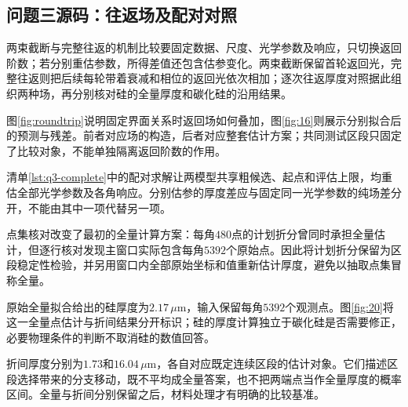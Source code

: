 \subsection{问题三源码：往返场及配对对照}
\label{sec:appendix-q3}

两束截断与完整往返的机制比较要固定数据、尺度、光学参数及响应，只切换返回阶数；若分别重估参数，所得差值还包含估参变化。两束截断保留首轮返回光，完整往返则把后续每轮带着衰减和相位的返回光依次相加；逐次往返厚度对照据此组织两种场，再分别核对硅的全量厚度和碳化硅的沿用结果。

图\ref{fig:roundtrip}说明固定界面关系时返回场如何叠加，图\ref{fig:16}则展示分别拟合后的预测与残差。前者对应场的构造，后者对应整套估计方案；共同测试区段只固定了比较对象，不能单独隔离返回阶数的作用。

清单\ref{lst:q3-complete}中的配对求解让两模型共享粗候选、起点和评估上限，均重估全部光学参数及各角响应。分别估参的厚度差应与固定同一光学参数的纯场差分开，不能由其中一项代替另一项。

点集核对改变了最初的全量计算方案：每角$480$点的计划折分曾同时承担全量估计，但逐行核对发现主窗口实际包含每角$5392$个原始点。因此将计划折分保留为区段稳定性检验，并另用窗口内全部原始坐标和值重新估计厚度，避免以抽取点集冒称全量。

原始全量拟合给出的硅厚度为$2.17\,\mu\mathrm{m}$，输入保留每角$5392$个观测点。图\ref{fig:20}将这一全量点估计与折间结果分开标识；硅的厚度计算独立于碳化硅是否需要修正，必要物理条件的判断不取消硅的数值回答。

折间厚度分别为$1.73$和$16.04\,\mu\mathrm{m}$，各自对应既定连续区段的估计对象。它们描述区段选择带来的分支移动，既不平均成全量答案，也不把两端点当作全量厚度的概率区间。全量与折间分别保留之后，材料处理才有明确的比较基准。

